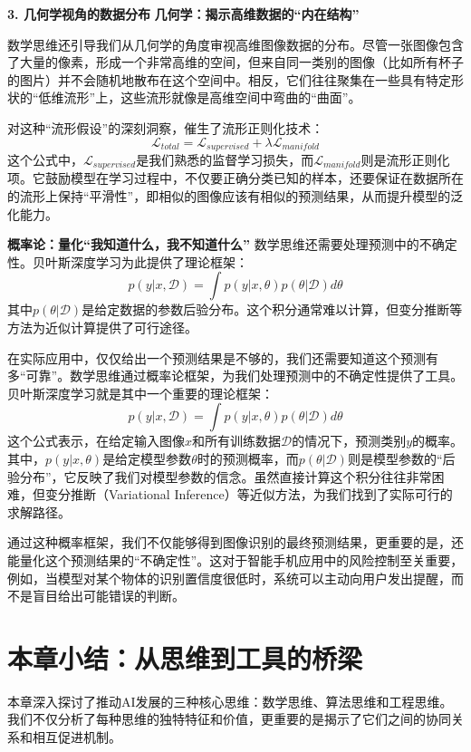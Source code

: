 \textbf{3. 几何学视角的数据分布}
\textbf{几何学：揭示高维数据的“内在结构”}

数学思维还引导我们从几何学的角度审视高维图像数据的分布。尽管一张图像包含了大量的像素，形成一个非常高维的空间，但来自同一类别的图像（比如所有杯子的图片）并不会随机地散布在这个空间中。相反，它们往往聚集在一些具有特定形状的“低维流形”上，这些流形就像是高维空间中弯曲的“曲面”。

对这种“流形假设”的深刻洞察，催生了流形正则化技术：
$$\mathcal{L}_{total} = \mathcal{L}_{supervised} + \lambda \mathcal{L}_{manifold}$$
这个公式中，$\mathcal{L}_{supervised}$是我们熟悉的监督学习损失，而$\mathcal{L}_{manifold}$则是流形正则化项。它鼓励模型在学习过程中，不仅要正确分类已知的样本，还要保证在数据所在的流形上保持“平滑性”，即相似的图像应该有相似的预测结果，从而提升模型的泛化能力。

\textbf{概率论：量化“我知道什么，我不知道什么”}
数学思维还需要处理预测中的不确定性。贝叶斯深度学习为此提供了理论框架：
$$p(y|x, \mathcal{D}) = \int p(y|x, \theta) p(\theta|\mathcal{D}) d\theta$$
其中$p(\theta|\mathcal{D})$是给定数据的参数后验分布。这个积分通常难以计算，但变分推断等方法为近似计算提供了可行途径。

在实际应用中，仅仅给出一个预测结果是不够的，我们还需要知道这个预测有多“可靠”。数学思维通过概率论框架，为我们处理预测中的不确定性提供了工具。贝叶斯深度学习就是其中一个重要的理论框架：
$$p(y|x, \mathcal{D}) = \int p(y|x, \theta) p(\theta|\mathcal{D}) d\theta$$
这个公式表示，在给定输入图像$x$和所有训练数据$\mathcal{D}$的情况下，预测类别$y$的概率。其中，$p(y|x, \theta)$是给定模型参数$\theta$时的预测概率，而$p(\theta|\mathcal{D})$则是模型参数的“后验分布”，它反映了我们对模型参数的信念。虽然直接计算这个积分往往非常困难，但变分推断（Variational Inference）等近似方法，为我们找到了实际可行的求解路径。

通过这种概率框架，我们不仅能够得到图像识别的最终预测结果，更重要的是，还能量化这个预测结果的“不确定性”。这对于智能手机应用中的风险控制至关重要，例如，当模型对某个物体的识别置信度很低时，系统可以主动向用户发出提醒，而不是盲目给出可能错误的判断。





\section{本章小结：从思维到工具的桥梁}

本章深入探讨了推动AI发展的三种核心思维：数学思维、算法思维和工程思维。我们不仅分析了每种思维的独特特征和价值，更重要的是揭示了它们之间的协同关系和相互促进机制。

